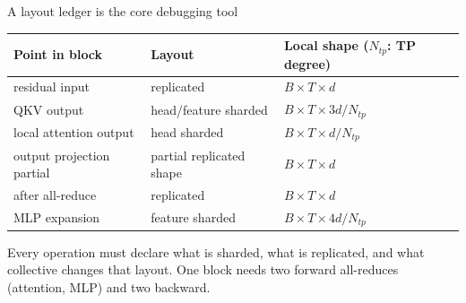 \documentclass[handout]{beamer}
\begin{document}
\begin{frame}{A layout ledger is the core debugging tool}
  \small
  \begin{tabular}{@{}>{\raggedright\arraybackslash}p{.29\linewidth}>{\raggedright\arraybackslash}p{.31\linewidth}>{\raggedright\arraybackslash}p{.30\linewidth}@{}}
    \toprule
    Point in block & Layout & Local shape ($N_{tp}$: TP degree) \\
    \midrule
    residual input & replicated & $B\times T\times d$ \\
    QKV output & head/feature sharded & $B\times T\times 3d/N_{tp}$ \\
    local attention output & head sharded & $B\times T\times d/N_{tp}$ \\
    output projection partial & partial replicated shape & $B\times T\times d$ \\
    after all-reduce & replicated & $B\times T\times d$ \\
    MLP expansion & feature sharded & $B\times T\times 4d/N_{tp}$ \\
    \bottomrule
  \end{tabular}
  \vfill
  Every operation must declare what is sharded, what is replicated, and what collective changes that layout. One block needs two forward all-reduces (attention, MLP) and two backward.
\end{frame}
\end{document}
